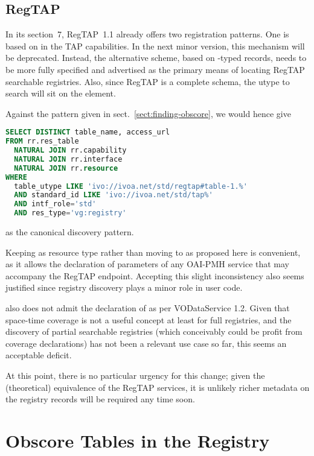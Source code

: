 \documentclass[11pt,a4paper]{ivoa}
\begin{document}
\subsection{RegTAP}

In its section~7, RegTAP~1.1 \citep{2019ivoa.spec.1011D} already offers
two registration patterns.  One is based on  in the TAP
capabilities.  In the next minor version, this mechanism will be
deprecated.  Instead, the alternative scheme, based on
-typed records, needs to be more fully specified and
advertised as the primary means of locating RegTAP searchable
registries.   Also, since RegTAP is a complete schema, the utype to
search will sit on the  element.

Against the pattern given in sect.~\ref{sect:finding-obscore}, we would hence
give
\begin{lstlisting}[language=SQL]
SELECT DISTINCT table_name, access_url
FROM rr.res_table
  NATURAL JOIN rr.capability
  NATURAL JOIN rr.interface
  NATURAL JOIN rr.resource
WHERE
  table_utype LIKE 'ivo://ivoa.net/std/regtap#table-1.%'
  AND standard_id LIKE 'ivo://ivoa.net/std/tap%'
  AND intf_role='std'
  AND res_type='vg:registry'
\end{lstlisting}
as the canonical discovery pattern.

Keeping  as resource type rather than moving to
 as proposed here is convenient, as it allows
the declaration of parameters of any OAI-PMH service that may accompany
the RegTAP endpoint.  Accepting this slight inconsistency also seems
justified since registry discovery plays a minor role in user code.

 also does not admit the declaration of
 as per VODataService 1.2.  Given that
space-time coverage is not a useful concept at least for full
registries, and the discovery of partial searchable registries (which
conceivably could be profit from coverage declarations)
has not been a relevant use case so
far, this seems an acceptable deficit.

At this point, there is no particular urgency for this change;
given the (theoretical) equivalence of the RegTAP
services, it is unlikely richer metadata on the registry records will be
required any time soon.


\section{Obscore Tables in the Registry}
\label{sect:obscore}
\end{document}
